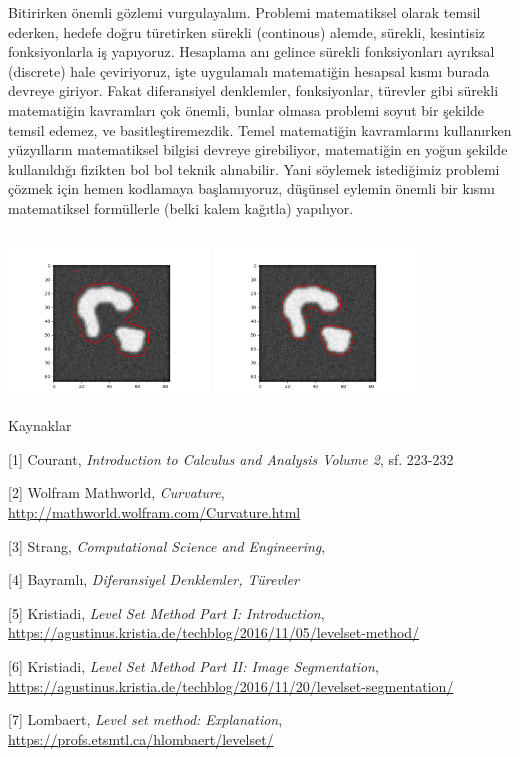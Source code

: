 \documentclass[12pt,fleqn]{article}\usepackage{../../common}
\begin{document}
Bitirirken önemli gözlemi vurgulayalım. Problemi matematiksel olarak temsil
ederken, hedefe doğru türetirken sürekli (continous) alemde, sürekli,
kesintisiz fonksiyonlarla iş yapıyoruz. Hesaplama anı gelince sürekli
fonksiyonları ayrıksal (discrete) hale çeviriyoruz, işte uygulamalı
matematiğin hesapsal kısmı burada devreye giriyor. Fakat diferansiyel
denklemler, fonksiyonlar, türevler gibi sürekli matematiğin kavramları çok
önemli, bunlar olmasa problemi soyut bir şekilde temsil edemez, ve
basitleştiremezdik. Temel matematiğin kavramlarını kullanırken yüzyılların
matematiksel bilgisi devreye girebiliyor, matematiğin en yoğun şekilde
kullanıldığı fizikten bol bol teknik alınabilir. Yani söylemek istediğimiz
problemi çözmek için hemen kodlamaya başlamıyoruz, düşünsel eylemin önemli
bir kısmı matematiksel formüllerle (belki kalem kağıtla) yapılıyor.

\inputminted[fontsize=\footnotesize]{python}{levelset2o.py}

\includegraphics[height=4cm]{img1/level_2_040.png}
\includegraphics[height=4cm]{img1/level_2_100.png}

Kaynaklar

[1] Courant, {\em Introduction to Calculus and Analysis Volume 2}, sf. 223-232

[2] Wolfram Mathworld, {\em Curvature}, \url{http://mathworld.wolfram.com/Curvature.html}

[3] Strang, {\em Computational Science and Engineering},

[4] Bayramlı, {\em Diferansiyel Denklemler, Türevler}

[5] Kristiadi, {\em Level Set Method Part I: Introduction},
    \url{https://agustinus.kristia.de/techblog/2016/11/05/levelset-method/}

[6] Kristiadi, {\em Level Set Method Part II: Image Segmentation},
    \url{https://agustinus.kristia.de/techblog/2016/11/20/levelset-segmentation/}

[7] Lombaert, {\em Level set method: Explanation},
    \url{https://profs.etsmtl.ca/hlombaert/levelset/}
    
\end{document}
